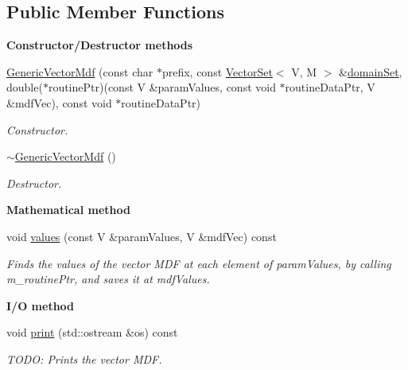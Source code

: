 \subsection*{Public Member Functions}
\begin{Indent}{\bf Constructor/\-Destructor methods}\par
\begin{DoxyCompactItemize}
\item 
\hyperlink{class_q_u_e_s_o_1_1_generic_vector_mdf_abb32a5acd62865f3a765aee34cb5b432}{Generic\-Vector\-Mdf} (const char $\ast$prefix, const \hyperlink{class_q_u_e_s_o_1_1_vector_set}{Vector\-Set}$<$ V, M $>$ \&\hyperlink{class_q_u_e_s_o_1_1_base_vector_mdf_ab060724f092b6623df50c0d0d725174c}{domain\-Set}, double($\ast$routine\-Ptr)(const V \&param\-Values, const void $\ast$routine\-Data\-Ptr, V \&mdf\-Vec), const void $\ast$routine\-Data\-Ptr)
\begin{DoxyCompactList}\small\item\em Constructor. \end{DoxyCompactList}\item 
\hyperlink{class_q_u_e_s_o_1_1_generic_vector_mdf_a4074117044028eb153e63797c2b130fd}{$\sim$\-Generic\-Vector\-Mdf} ()
\begin{DoxyCompactList}\small\item\em Destructor. \end{DoxyCompactList}\end{DoxyCompactItemize}
\end{Indent}
\begin{Indent}{\bf Mathematical method}\par
\begin{DoxyCompactItemize}
\item 
void \hyperlink{class_q_u_e_s_o_1_1_generic_vector_mdf_a0f414d8b4756eef7f28166752dc8d48d}{values} (const V \&param\-Values, V \&mdf\-Vec) const 
\begin{DoxyCompactList}\small\item\em Finds the values of the vector M\-D\-F at each element of {\ttfamily param\-Values}, by calling {\ttfamily m\-\_\-routine\-Ptr}, and saves it at {\ttfamily mdf\-Values}. \end{DoxyCompactList}\end{DoxyCompactItemize}
\end{Indent}
\begin{Indent}{\bf I/\-O method}\par
\begin{DoxyCompactItemize}
\item 
void \hyperlink{class_q_u_e_s_o_1_1_generic_vector_mdf_a69bc51a5e118670a573c5378ea1e634f}{print} (std\-::ostream \&os) const 
\begin{DoxyCompactList}\small\item\em T\-O\-D\-O\-: Prints the vector M\-D\-F. \end{DoxyCompactList}\end{DoxyCompactItemize}
\end{Indent}
